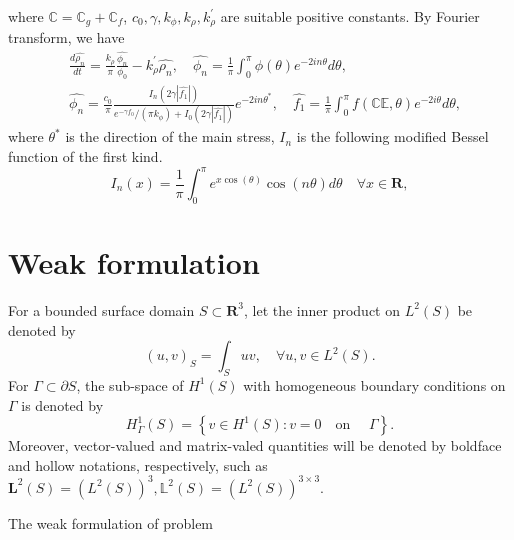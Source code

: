 \documentclass[11pt]{amsart}
\numberwithin{figure}{section}
\theoremstyle{plain}
\theoremstyle{definition}
\numberwithin{equation}{section}
\begin{document}
where $\mathbb{C} = \mathbb{C}_{g} + \mathbb{C}_{f} $, $c_0, \gamma, k_\phi, k_\rho, k_\rho^{'}$ are suitable positive constants.
By Fourier transform, we have 
\begin{align}
& \frac{ d \widehat{\rho_{n}} }{ d t }  = \frac{ k_{\rho}  }{ \pi } \frac{ \widehat{\phi_{n} } }{ {\phi_{0} } } - k_{\rho} ^{'} \widehat{\rho_{n} },  \quad 
\widehat{\phi_{n}} = \frac{1}{ \pi } \int_{0} ^{\pi} \phi(\theta) e^{-2in\theta} d\theta, \\
& \widehat{\phi_{n}}  = \frac{ c_0 }{ \pi } \frac{ I_{n} \left(2 \gamma \left|\widehat{f_1}\right|\right) }{ { e^{-\gamma f_0} }/( \pi k_{\phi}  ) + I_0 \left( 2 \gamma \left| \widehat{f_1} \right|\right)  } e^{-2in\theta^*}, \quad 
\widehat{f_1} = \frac{ 1 }{ \pi } \int_{0} ^{\pi} f(\mathbb{C}\mathbb{E},\theta) e^{-2i\theta} d \theta,
\end{align}
where $\theta^* $ is the direction of the main stress, $I_{n}$ is the following modified Bessel function of the first kind.
\[
I_{n} (x)  = \frac{ 1 }{ \pi } \int_{0} ^\pi e^{x \cos(\theta)} \cos ( n \theta )d \theta \quad \forall x \in \mathbf{R},
\] 

\newpage 

\section{Weak formulation}

For a bounded surface domain $S \subset \mathbf{R}^{3} $, let the inner product on $L^{2} (S)$ be denoted by 
\[
  (u,v)_{S} = \int_{S} uv,\quad \forall u, v \in L^{2} (S).
\] 
For $\Gamma \subset \partial S$, the sub-space of $H^{1} (S)$ with homogeneous boundary conditions on $\Gamma$ is denoted by
\[
H^{1} _{\Gamma} (S) = \left\{ v \in H^{1} (S): v = 0 \quad \text{on } \quad \Gamma\right\}.
\] 
Moreover, vector-valued and matrix-valed quantities will be denoted by boldface and hollow notations, respectively, such as $\bm{L}^{2} (S) = \left(L^{2} (S)\right)^{3}, \mathbb{L}^{2} (S) = \left(L^{2} (S)\right) ^{3 \times 3} $.

The weak formulation of problem 
\end{document}
